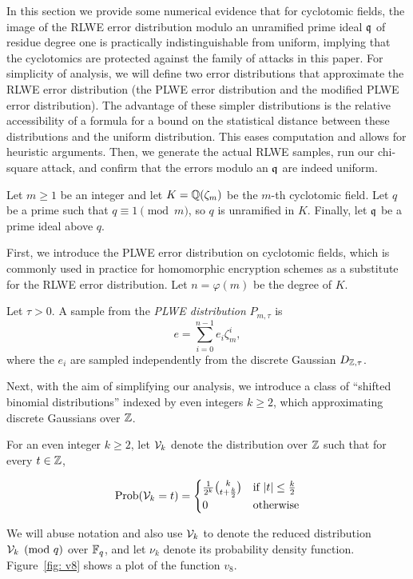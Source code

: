 \documentclass[envcountsame]{llncs}
\begin{document}
In this section we provide some numerical evidence that for cyclotomic fields, the image of the RLWE error distribution modulo an unramified prime ideal $\mathfrak{q}$ of residue degree one is practically indistinguishable from uniform, implying that the cyclotomics are protected against the family of attacks in this paper.  For simplicity of analysis, we will define two error distributions that approximate the RLWE error distribution (the PLWE error distribution and the modified PLWE error distribution).  The advantage of these simpler distributions is the relative accessibility of a formula for a bound on the statistical distance between these distributions and the uniform distribution.  This eases computation and allows for heuristic arguments. Then, we generate the actual RLWE samples, run our chi-square attack, and confirm that the errors modulo an $\mathfrak{q}$ are indeed uniform.



Let $m \geq 1$ be an integer and let $K = \mathbb{Q}(\zeta_m)$ be the $m$-th cyclotomic field. Let $q$ be a prime such that
$q \equiv 1\pmod{m}$, so $q$ is unramified in $K$. Finally, let $\mathfrak{q}$ be a prime ideal above $q$.

First, we introduce the PLWE error distribution on cyclotomic fields, which is commonly used in practice for homomorphic encryption schemes as a substitute for the RLWE error distribution. Let $n = \varphi(m)$ be the degree of $K$.
\begin{definition}
Let $\tau > 0$. A sample from the {\it PLWE distribution} $P_{m,\tau}$ is
\[
    e = \sum_{i=0}^{n-1} e_i \zeta_m^i,
\]
where the $e_i$ are sampled independently from the discrete Gaussian $D_{\mathbb{Z},\tau}$.
\end{definition}

Next, with the aim of simplifying our analysis, we introduce a class of ``shifted binomial distributions'' indexed by even integers $k \geq 2$, which approximating discrete Gaussians over $\mathbb{Z}$.

\begin{definition}
For an even integer $k \geq 2$, let $\mathcal{V}_{k}$ denote the distribution over $\mathbb{Z}$ such that for every $t \in \mathbb{Z}$,

$$\operatorname{Prob}(\mathcal{V}_{k} = t) =  \begin{cases} \frac{1}{2^k}{k \choose t+\frac{k}{2}} &\mbox{if } |t| \leq \frac{k}{2} \\
0 & \mbox{otherwise}  \end{cases}$$

\end{definition}
We will abuse notation and also use $\mathcal{V}_{k}$ to denote the reduced  distribution $\mathcal{V}_{k} \pmod {q}$ over $\mathbb{F}_q$, and let $\nu_{k}$ denote its probability density function. Figure~\ref{fig: v8} shows a plot of the function $v_8$.
\end{document}
